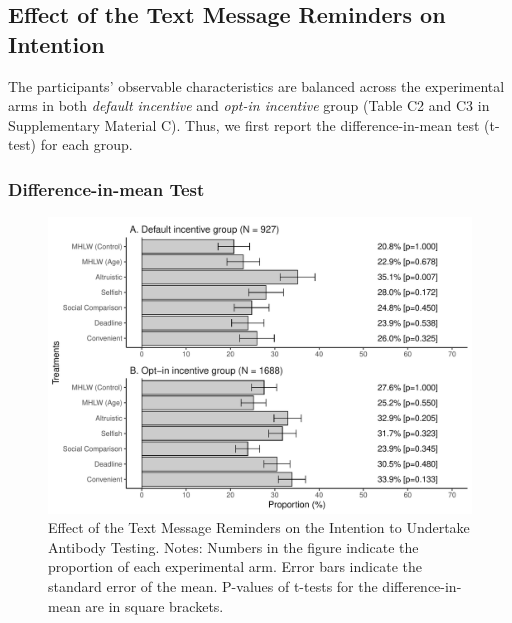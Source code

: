 \documentclass[
      12pt,
    a4paper
]{article}
\begin{document}
\hypertarget{intention}{%
\subsection{Effect of the Text Message Reminders on Intention}\label{intention}}

The participants' observable characteristics are balanced across the experimental arms in both \emph{default incentive} and \emph{opt-in incentive} group (Table C2 and C3 in Supplementary Material C). Thus, we first report the difference-in-mean test (t-test) for each group.

\hypertarget{difference-in-mean-test}{%
\subsubsection{Difference-in-mean Test}\label{difference-in-mean-test}}

\begin{figure}[t]
\includegraphics{Main-Document-LaTeX_files/figure-latex/ttest-int-test-1} \caption{Effect of the Text Message Reminders on the Intention to Undertake Antibody Testing. Notes: Numbers in the figure indicate the proportion of each experimental arm. Error bars indicate the standard error of the mean. P-values of t-tests for the difference-in-mean are in square brackets.}\label{fig:ttest-int-test}
\end{figure}
\end{document}
